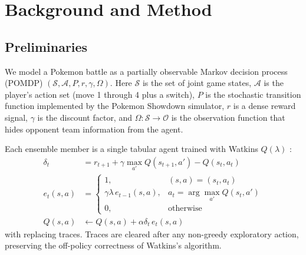 
\section{Background and Method}
\label{sec:method}

\subsection{Preliminaries}
\label{sec:prelim}

We model a Pokemon battle as a partially observable Markov decision process
(POMDP) $(\mathcal{S}, \mathcal{A}, P, r, \gamma, \Omega)$. Here $\mathcal{S}$
is the set of joint game states, $\mathcal{A}$ is the player's action set
(move 1 through 4 plus a switch), $P$ is the stochastic transition function
implemented by the Pokemon Showdown simulator, $r$ is a dense reward signal,
$\gamma$ is the discount factor, and $\Omega : \mathcal{S} \to \mathcal{O}$
is the observation function that hides opponent team information from the
agent.

Each ensemble member is a single tabular agent trained with Watkins
$Q(\lambda)$ \citep{watkins1989, sutton2018}:
\begin{align}
  \delta_t       &= r_{t+1} + \gamma \max_{a'} Q(s_{t+1}, a') - Q(s_t, a_t) \\
  e_t(s, a)      &= \begin{cases}
                     1, & (s, a) = (s_t, a_t) \\
                     \gamma \lambda \, e_{t-1}(s, a), &
                     a_t = \arg\max_{a'} Q(s_t, a') \\
                     0, & \text{otherwise}
                    \end{cases} \\
  Q(s, a)        &\leftarrow Q(s, a) + \alpha \delta_t \, e_t(s, a)
\end{align}
with replacing traces. Traces are cleared after any non-greedy exploratory
action, preserving the off-policy correctness of Watkins's algorithm.

